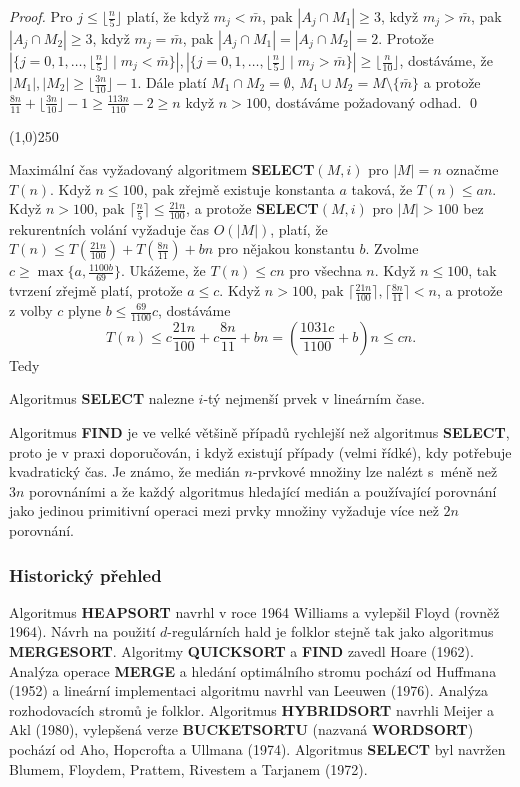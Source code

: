 \documentclass[a4paper,12pt]{article}
\newenvironment{myproof}{
  \begin{proof}
    
  }{
  \end{proof}
  \begin{center}
   \line(1,0){250}
   \end{center}
  }
\begin{document}
\begin{myproof} Pro $j\le\lfloor\frac n5\rfloor$ platí, že když $
m_j<\bar {m}$, pak 
$|A_j\cap M_1|\ge 3$, když $m_j>\bar {m}$, pak $|A_j\cap M_2|\ge 
3$, když $m_j=\bar {m}$, 
pak $|A_j\cap M_1|=|A_j\cap M_2|=2$.  Protože 
$|\{j=0,1,\dots,\lfloor\frac n5\rfloor\mid m_j<\bar {m}\}|,|\{j=0
,1,\dots,\lfloor\frac n5\rfloor\mid m_j>\bar {m}\}|\ge\lfloor\frac 
n{10}\rfloor$, 
dostáváme, že $|M_1|,|M_2|\ge\lfloor\frac {3n}{10}\rfloor 
-1$.  Dále platí $M_1\cap M_2=\emptyset$, 
$M_1\cup M_2=M\setminus \{\bar {m}\}$ a protože $\frac {8n}{11}
+\lfloor\frac {3n}{10}\rfloor -1\ge\frac {113n}{110}-2\ge n$ 
když $n>100$, dostáváme požadovaný odhad. \qed
\end{myproof}

Maximální čas vyžadovaný algoritmem  
{\bf SELECT$(M,i)$} pro $|M|=n$ označme $T(n)$.  Když $n\le 
100$, pak zřejmě 
exis\-tuje konstanta $a$ taková, že $T(n)\le an$.  Když $
n>100$, 
pak $\lceil\frac n5\rceil\le\frac {21n}{100}$, a protože {\bf SELECT$
(M,i)$} pro $|M|>100$ bez 
rekurentních volání vyžaduje čas $O(|M|)$, platí, že $
T(n)\le T(\frac {21n}{100})+T(\frac {8n}{11})+bn$ pro nějakou konstantu 
$b$.  Zvolme $c\ge\max\{a,\frac {1100b}{69}\}$. Ukážeme, že $
T(n)\le cn$ pro 
všechna $n$.  
Když $n\le 100$, tak tvrzení zřejmě platí, protože $
a\le c$.  Když 
$n>100$, pak $\lceil\frac {21n}{100}\rceil ,\lceil\frac {8n}{11}\rceil 
<n$, a protože z volby $c$ plyne 
$b\le\frac {69}{1100}c$, 
dostáváme 
$$T(n)\le c\frac {21n}{100}+c\frac {8n}{11}+bn=(\frac {1031c}{110
0}+b)n\le cn.$$
Tedy

\begin{veta}Algoritmus {\bf SELECT} nalezne $i$-tý nejmenší 
prvek v lineárním čase.
\end{veta}

Algoritmus {\bf FIND} je ve velké většině 
případů 
rychlejší než algoritmus {\bf SELECT}, proto je v praxi 
doporučován, i když existují 
případy (velmi řídké), kdy potřebuje kvadratický čas.
Je známo, že medián $n$-prvkové množiny lze nalézt s~méně než $3n$ porovnáními a že každý algoritmus hledající 
medián a používající porovnání jako jedinou primitivní 
operaci mezi prvky množiny vyžaduje více než $2n$ 
porovnání.

\subsubsection{Historický přehled}

Algoritmus {\bf HEAPSORT }
navrhl v roce 1964 Williams a vylepšil Floyd (rovněž 1964).  Návrh 
na použití $d$-regulár\-ních hald je folklor stejně tak jako  
algoritmus {\bf MER\-GESORT}.  Algoritmy {\bf QUICKSORT} a {\bf FIND }
zavedl Hoare (1962).  Analýza ope\-race {\bf MERGE} a 
hledání optimálního stro\-mu pochází od Huffmana 
(1952) a lineární implementaci algoritmu navrhl van 
Leeuwen (1976).  Analýza rozhodovacích stromů je 
folklor. Algoritmus {\bf HYBRIDSORT} navrhli Meijer a Akl (1980), 
vylepše\-ná verze {\bf BUCKETSORTU} (nazvaná {\bf WORDSORT}) 
pochází od Aho, Hopcrofta a Ullmana (1974). Algoritmus {\bf SELECT} byl 
navržen Blumem, Floydem, Prattem, Rivestem a 
Tarjanem (1972).
\end{document}
